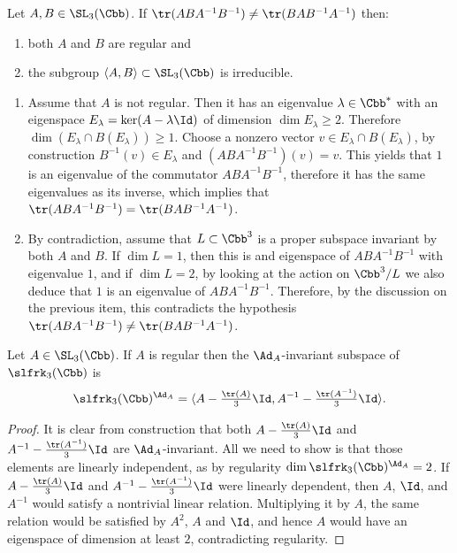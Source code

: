 \begin{lemm}\label{Lemma:regtr}
Let $A,B\in \SL_3(\Cbb)$. If $\tr(ABA^{-1}B^{-1})\neq \tr(BAB^{-1}A^{-1})$ then:
\begin{enumerate}\romanenumi
\item \label{list-lem8.2.1}
both $A$ and $B$ are regular and
\item \label{list-lem8.2.2}
the subgroup $\langle A,B \rangle \subset \SL_3(\Cbb)$ is irreducible.
\end{enumerate}
\end{lemm}
\goodbreak
\begin{proofc}
\begin{enumerate}\romanenumi
\item[{\eqref{list-lem8.2.1}}] Assume that $A$ is not regular. Then it has an eigenvalue $\lambda\in\Cbb^*$ with an eigenspace $E_\lambda=\ker(A-\lambda\Id)$ of dimension $\dim E_\lambda\geq 2$. Therefore $\dim (E_\lambda\cap B(E_\lambda))\geq 1$. Choose a nonzero vector $v\in E_\lambda\cap B(E_\lambda)$, by construction $B^{-1}(v)\in E_\lambda$ and $(ABA^{-1}B^{-1})(v)= v$. This yields that $1$ is an eigenvalue of the commutator $ABA^{-1}B^{-1}$, therefore it has the same eigenvalues as its inverse, which implies that $\tr(ABA^{-1}B^{-1})=\tr(BAB^{-1}A^{-1})$.

\item[{\eqref{list-lem8.2.2}}] By contradiction, assume that $L \subset \Cbb^3$ is a proper subspace invariant by both $A$ and $B$. If $\dim L=1$, then this is and eigenspace of $ABA^{-1}B^{-1}$ with eigenvalue $1$, and if $\dim L=2$, by looking at the action on $\Cbb^3/L$ we also deduce that $1$ is an eigenvalue of $ABA^{-1}B^{-1}$. Therefore, by the discussion on the previous item, this contradicts the hypothesis $\tr(ABA^{-1}B^{-1})\neq \tr(BAB^{-1}A^{-1})$.\qedhere
\end{enumerate}
\end{proofc}

\begin{lemm}\label{Lemma:reginv}
Let $A\in \SL_3(\Cbb)$. If $A$ is regular then the $\Ad_A$-invariant subspace of $\slfrk_3(\Cbb)$ is
\[
\slfrk_3(\Cbb)^{\Ad_A}=\langle A-\tfrac{\tr(A)}3\Id, A^{-1}-\tfrac{\tr(A^{-1})}3\Id\rangle.
\]
\end{lemm}

\begin{proof}
It is clear from construction that both $A-\frac{\tr(A)}3\Id$ and $A^{-1}-\frac{\tr(A^{-1})}3\Id$ are $\Ad_A$-invariant. All we need to show is that those elements are linearly independent, as by regularity $\dim \slfrk_3(\Cbb)^{\Ad_A}=2$. If $ A-\frac{\tr(A)}3\Id$ and $ A^{-1}-\frac{\tr(A^{-1})}3\Id$ were linearly dependent, then $A$, $\Id$, and $A^{-1}$ would satisfy a nontrivial linear relation. Multiplying it by $A$, the same relation would be satisfied by $A^2$, $A$ and $\Id$, and hence $A$ would have an eigenspace of dimension at least $2$, contradicting regularity.
\end{proof}



